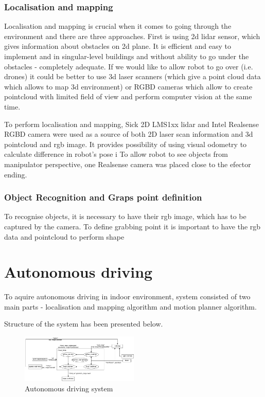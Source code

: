 \documentclass[conference,a4paper]{IEEEtran}
\begin{document}
\subsubsection{Localisation and mapping}
Localisation and mapping is crucial when it comes to going through the environment and there are three approaches. First is using 2d lidar sensor, which gives information about obstacles on 2d plane. It is efficient and easy to implement and in  singular-level buildings and without 
ability to go under the obstacles - completely adequate. If we would like to allow robot to go over (i.e. drones) it could be better to use 3d laser scanners (which give a point cloud data which allows to map 3d environment) or RGBD cameras which allow to create 
pointcloud with limited field of view and perform computer vision at the same time.

To perform localisation and mapping, Sick 2D LMS1xx lidar and Intel Realsense RGBD camera were used as a source of both 2D laser scan information and 3d pointcloud and rgb image. It provides possibility of using visual odometry to calculate difference in robot's pose i
To allow robot to see objects from manipulator perspective, one Realsense camera was placed close to the efector ending.

\subsubsection{Object Recognition and Graps point definition}
To recognise objects, it is necessary to have their rgb image, which has to be captured by the camera. 
To define grabbing point it is important to have the rgb data and pointcloud to perform shape 

\section{Autonomous driving}
To aquire autonomous driving in indoor environment, system consisted of two main parts - localisation and mapping algorithm and motion planner algorithm.

Structure of the system has been presented below.

\begin{figure}[ht]
  \includegraphics[width=0.5\textwidth]{img/navigation_scheme.png}
  \caption[navigation structure]{Autonomous driving system}
\end{figure}
\end{document}
